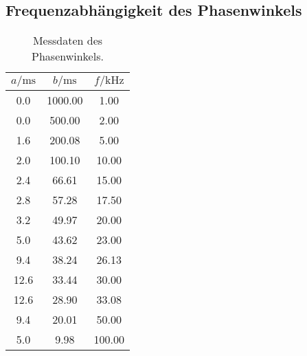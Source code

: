 \subsection{Frequenzabhängigkeit des Phasenwinkels}
\begin{table}[H]
        \caption{Messdaten des Phasenwinkels.}
        \label{tab:phasetab}
        \centering
        \begin{tabular}{S[table-format=2.1(0)e0] S[table-format=4.2(0)e0] S[table-format=3.2(0)e0] }
                \toprule
                {$a/\si{\milli\second}$} & {$b/\si{\milli\second}$} & {$f/\si{\kilo\hertz}$} \\
                     & 1000.00   & 1.00   \\
                0.0     & 500.00    & 2.00   \\
                1.6     & 200.08    & 5.00   \\
                2.0     & 100.10    & 10.00  \\
                2.4     & 66.61     & 15.00  \\
                2.8     & 57.28     & 17.50  \\
                3.2     & 49.97     & 20.00  \\
                5.0     & 43.62     & 23.00  \\
                9.4     & 38.24     & 26.13  \\
                12.6    & 33.44     & 30.00  \\
                12.6    & 28.90     & 33.08  \\
                9.4     & 20.01     & 50.00  \\
                5.0     & 9.98      & 100.00 \\
                \bottomrule
        \end{tabular}
\end{table}
%
